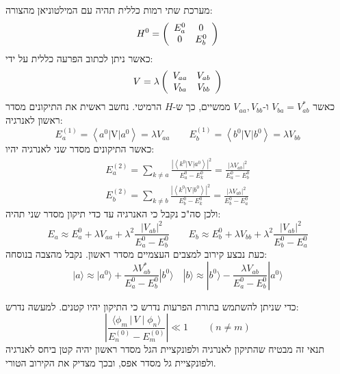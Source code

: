 \documentclass{tstextbook}
\begin{document}
\begin{example}
מערכת שתי רמות כללית תהיה עם המילטוניאן מהצורה:
$${H}^{0}=\left(\begin{array}{c c}{{E_{a}^{0}}}&{{0}}\\ {{0}}&{{E_{b}^{0}}}\end{array}\right)$$
כאשר ניתן לכתוב הפרעה כללית על ידי:
$${V}=\lambda\left(\begin{array}{c c}{{V_{a a}}}&{{V_{a b}}}\\ {{V_{b a}}}&{{V_{b b}}}\end{array}\right)$$
כאשר \(V_{ba}=V_{ab}^{*}\) ו-\(V_{aa},V_{bb}\) ממשיים, כך ש-\(H\) הרמיטי. נחשב ראשית את התיקונים מסדר ראשון לאנרגיה:
$$E_{a}^{(1)}=\left\langle  a^{0}|\mathrm{V}|a^{0} \right\rangle=\lambda V_{a a} \qquad E_{b}^{(1)}=\left\langle  b^{0}|\mathrm{V}|b^{0} \right\rangle=\lambda V_{b b}$$
כאשר התיקונים מסדר שני לאנרגיה יהיו:
$$\begin{gather}E_{a}^{(2)}=\sum_{k\neq a}\frac{|\left\langle  k^{0}|\mathrm{V}|a^{0} \right\rangle|^{2}}{E_{a}^{0}-E_{k}^{0}}=\frac{|\lambda V_{a b}|^{2}}{E_{a}^{0}-E_{b}^{0}}\\ E_{b}^{(2)}=\sum_{k\neq b}\frac{|\left\langle  k^{0}|\mathrm{V}|b^{0} \right\rangle|^{2}}{E_{b}^{0}-E_{k}^{0}}=\frac{|\lambda V_{a b}|^{2}}{E_{b}^{0}-E_{a}^{0}}
\end{gather}$$
ולכן סה"כ נקבל כי האנרגיה עד כדי תיקון מסדר שני תהיה:
$$E_{a}\approx E_{a}^{0}+\lambda V_{a a}+\lambda^{2}\frac{|V_{a b}|^{2}}{E_{a}^{0}-E_{b}^{0}}\qquad E_{b}\approx E_{b}^{0}+\lambda V_{b b}+\lambda^{2}\frac{|V_{a b}|^{2}}{E_{b}^{0}-E_{a}^{0}}$$
כעת נבצע קירוב למצבים העצמיים מסדר ראשון. נקבל מהצבה בנוסחה:
$$|a\rangle\approx|a^{0}\rangle+\frac{\lambda V_{a b}^{*}}{E_{a}^{0}-E_{b}^{0}}|b^{0}\rangle  \quad |b\rangle\approx|b^{0}\rangle-\frac{\lambda V_{a b}}{E_{a}^{0}-E_{b}^{0}}|a^{0}\rangle$$

\end{example}
\begin{proposition}
כדי שניתן להשתמש בתורת הפרעות נדרש כי התיקון יהיו קטנים. למעשה נדרש:
$$\left|\frac{\langle\phi_{m}\,|\,V\mid\phi_{n}\rangle}{E_{n}^{(0)}-E_{m}^{(0)}}\right|\ll1\qquad(n\neq m)$$
תנאי זה מבטיח שהתיקון לאנרגיה ולפונקציית הגל מסדר ראשון יהיה קטן ביחס לאנרגיה ולפונקציית גל מסדר אפס, ובכך מצדיק את הקירוב הטורי.

\end{proposition}
\end{document}
